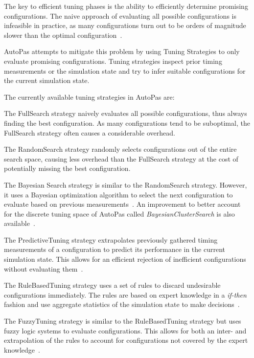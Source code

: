 \documentclass[conference]{IEEEtran}
\begin{document}
The key to efficient tuning phases is the ability to efficiently determine promising configurations. The naive approach of evaluating all possible configurations is infeasible in practice, as many configurations turn out to be orders of magnitude slower than the optimal configuration~\cite{endreport.pdf}\cite{Manuel_Lerchner_Thesis.pdf}.

AutoPas attempts to mitigate this problem by using Tuning Strategies to only evaluate promising configurations. Tuning strategies inspect prior timing measurements or the simulation state and try
to infer suitable configurations for the current simulation state.

The currently available tuning strategies in AutoPas are:

\begin{description}[style=nextline]
    \item[FullSearch]
        The FullSearch strategy naively evaluates all possible configurations, thus always finding the best configuration. As many configurations tend to be suboptimal\cite{Manuel_Lerchner_Thesis.pdf}, the FullSearch strategy often causes a considerable overhead.

    \item[RandomSearch]
        The RandomSearch strategy randomly selects configurations out of the entire search space, causing less overhead than the FullSearch strategy at the cost of potentially missing the best configuration.

    \item[BayesianSearch]
        The Bayesian Search strategy is similar to the RandomSearch strategy. However, it uses a Bayesian optimization algorithm to select the next configuration to evaluate based on previous measurements~\cite{njan_master}. An improvement to better account for the discrete tuning space of AutoPas called \textit{BayesianClusterSearch} is also available~\cite{njan_master}.

    \item[PredictiveTuning]
        The PredictiveTuning strategy extrapolates previously gathered timing measurements of a configuration to predict its performance in the current simulation state. This allows for an efficient rejection of inefficient configurations without evaluating them~\cite{pelloth2020}.

    \item[RuleBasedTuning]
        The RuleBasedTuning strategy uses a set of rules to discard undesirable configurations immediately. The rules are based on expert knowledge in a \textit{if-then} fashion and use aggregate statistics of the simulation state to make decisions~\cite{endreport.pdf}.

    \item[FuzzyTuning]
        The FuzzyTuning strategy is similar to the RuleBasedTuning strategy but uses fuzzy logic systems to evaluate configurations. This allows for both an inter- and extrapolation of the rules to account for configurations not covered by the expert knowledge~\cite{Manuel_Lerchner_Thesis.pdf}.

\end{description}
\end{document}
